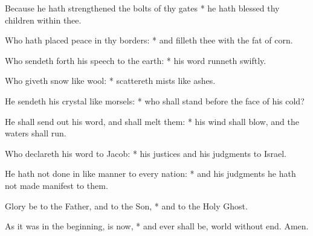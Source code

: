 ﻿\item Because he hath strengthened the bolts of thy gates * he hath blessed thy children within thee.
\item Who hath placed peace in thy borders: * and filleth thee with the fat of corn.
\item Who sendeth forth his speech to the earth: * his word runneth swiftly.
\item Who giveth snow like wool: * scattereth mists like ashes.
\item He sendeth his crystal like morsels: * who shall stand before the face of his cold?
\item He shall send out his word, and shall melt them: * his wind shall blow, and the waters shall run.
\item Who declareth his word to Jacob: * his justices and his judgments to Israel.
\item He hath not done in like manner to every nation: * and his judgments he hath not made manifest to them.
\item Glory be to the Father, and to the Son, * and to the Holy Ghost.
\item As it was in the beginning, is now, * and ever shall be, world without end. Amen.
